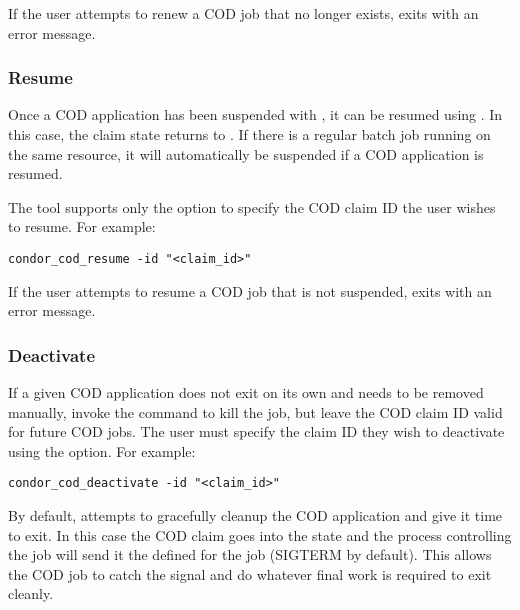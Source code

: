 If the user attempts to renew a COD job that no longer exists,
 exits with an error message.

\subsubsection{\label{sec:cod-claim-resume}Resume}

Once a COD application has been suspended with ,
it can be resumed using .
In this case, the claim state returns to \verb@Running@.
If there is a regular batch job running on the same resource, it will
automatically be suspended if a COD application is resumed.

The  tool supports only the  option to
specify the COD claim ID the user wishes to resume.
For example:
\begin{verbatim}
condor_cod_resume -id "<claim_id>"
\end{verbatim}

If the user attempts to resume a COD job that is not suspended,
 exits with an error message.


\subsubsection{\label{sec:cod-claim-deactivate}Deactivate}

If a given COD application does not exit on its own and needs to be
removed manually, invoke the 
command to kill the job, but leave the COD claim ID valid for future
COD jobs.
The user must specify the claim ID they wish to deactivate using the
 option.
For example:
\begin{verbatim}
condor_cod_deactivate -id "<claim_id>"
\end{verbatim}

By default,  attempts to gracefully cleanup
the COD application and give it time to exit.
In this case the COD claim goes into the \verb@Vacating@ state and the
 process controlling the job will send it the 
 defined for the job (SIGTERM by default).
This allows the COD job to catch the signal and do whatever final work
is required to exit cleanly.

